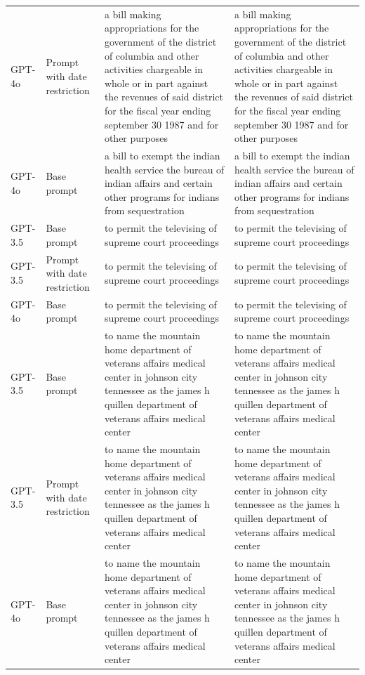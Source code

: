 \begin{longtable}{>{\raggedright\arraybackslash}p{1.4cm}>{\raggedright\arraybackslash}p{1.4cm}>{\raggedright\arraybackslash}p{5.5cm}>{\raggedright\arraybackslash}p{5.5cm}}
GPT-4o & Prompt with date restriction & a bill making appropriations for the government of the district of columbia and other activities chargeable in whole or in part against the revenues of said district for the fiscal year ending september 30 1987 and for other purposes & a bill making appropriations for the government of the district of columbia and other activities chargeable in whole or in part against the revenues of said district for the fiscal year ending september 30 1987 and for other purposes\\
GPT-4o & Base prompt & a bill to exempt the indian health service the bureau of indian affairs and certain other programs for indians from sequestration & a bill to exempt the indian health service the bureau of indian affairs and certain other programs for indians from sequestration\\
GPT-3.5 & Base prompt & to permit the televising of supreme court proceedings & to permit the televising of supreme court proceedings\\
GPT-3.5 & Prompt with date restriction & to permit the televising of supreme court proceedings & to permit the televising of supreme court proceedings\\
GPT-4o & Base prompt & to permit the televising of supreme court proceedings & to permit the televising of supreme court proceedings\\
GPT-3.5 & Base prompt & to name the mountain home department of veterans affairs medical center in johnson city tennessee as the james h quillen department of veterans affairs medical center & to name the mountain home department of veterans affairs medical center in johnson city tennessee as the james h quillen department of veterans affairs medical center\\
GPT-3.5 & Prompt with date restriction & to name the mountain home department of veterans affairs medical center in johnson city tennessee as the james h quillen department of veterans affairs medical center & to name the mountain home department of veterans affairs medical center in johnson city tennessee as the james h quillen department of veterans affairs medical center\\
GPT-4o & Base prompt & to name the mountain home department of veterans affairs medical center in johnson city tennessee as the james h quillen department of veterans affairs medical center & to name the mountain home department of veterans affairs medical center in johnson city tennessee as the james h quillen department of veterans affairs medical center\\

\end{longtable}
